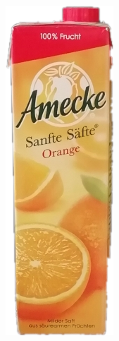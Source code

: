 \begin{appendices}
\begin{figure}[htb]
\begin{minipage}[c]{0.2\textwidth}
\end{minipage}
\hfill
\begin{minipage}[c]{0.08\textwidth}
\includegraphics[width=\textwidth]{Sources/Bild2_GW.png}

\end{minipage}
\end{figure}
\end{appendices}
